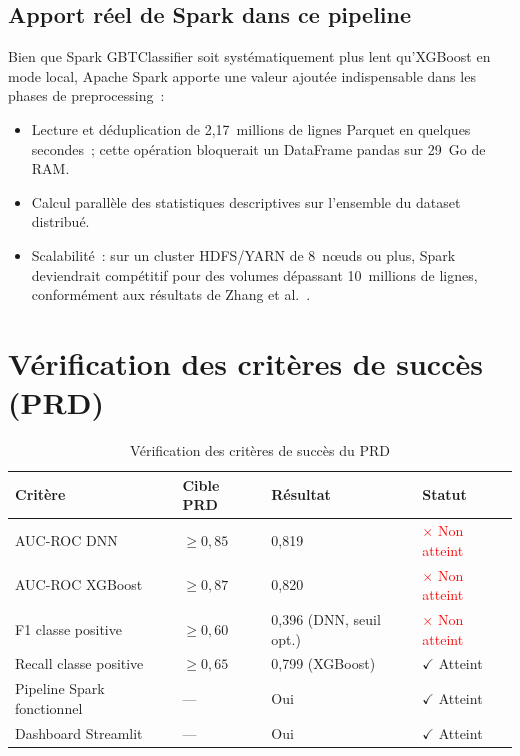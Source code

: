 \subsection{Apport réel de Spark dans ce pipeline}

Bien que Spark GBTClassifier soit systématiquement plus lent qu'XGBoost en mode
local, Apache Spark apporte une valeur ajoutée indispensable dans les phases de
preprocessing~:

\begin{itemize}
    \item Lecture et déduplication de 2,17~millions de lignes Parquet en quelques
          secondes~; cette opération bloquerait un DataFrame pandas sur 29~Go de RAM.
    \item Calcul parallèle des statistiques descriptives sur l'ensemble du dataset
          distribué.
    \item Scalabilité~: sur un cluster HDFS/YARN de 8~nœuds ou plus, Spark
          deviendrait compétitif pour des volumes dépassant 10~millions de lignes,
          conformément aux résultats de Zhang et al.~\cite{zhang2023}.
\end{itemize}

\section{Vérification des critères de succès (PRD)}

\begin{table}[H]
\centering
\caption{Vérification des critères de succès du PRD}
\label{tab:prd_check}
\begin{tabular}{llll}
\toprule
\textbf{Critère} & \textbf{Cible PRD} & \textbf{Résultat} & \textbf{Statut} \\
\midrule
AUC-ROC DNN      & $\geq 0{,}85$ & 0,819 & \textcolor{red}{$\times$ Non atteint} \\
AUC-ROC XGBoost  & $\geq 0{,}87$ & 0,820 & \textcolor{red}{$\times$ Non atteint} \\
F1 classe positive & $\geq 0{,}60$ & 0,396 (DNN, seuil opt.) & \textcolor{red}{$\times$ Non atteint} \\
Recall classe positive & $\geq 0{,}65$ & 0,799 (XGBoost) & \textcolor{green!60!black}{$\checkmark$ Atteint} \\
Pipeline Spark fonctionnel & --- & Oui & \textcolor{green!60!black}{$\checkmark$ Atteint} \\
Dashboard Streamlit & --- & Oui & \textcolor{green!60!black}{$\checkmark$ Atteint} \\
\bottomrule
\end{tabular}
\end{table}

